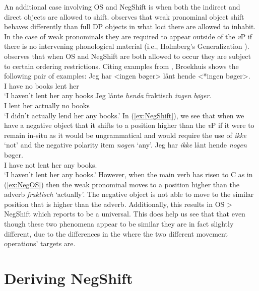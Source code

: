 \documentclass[12pt, letterpaper]{article}
\begin{document}
An additional case involving OS and NegShift is when both the indirect and direct objects are allowed to shift. \citet[417f]{broekhuisUnificationObjectShift2020} observes that weak pronominal object shift behaves differently than full DP objects in what loci there are allowed to inhabit. In the case of weak pronominals they are required to appear outside of the \textit{v}P if there is no intervening phonological material (i.e., Holmberg's Generalization \cite{holmbergWordOrderSyntactic1986,holmbergRemarksHolmbergGeneralization1999}). \citeauthor{broekhuisUnificationObjectShift2020} observes that when OS and NegShift are both allowed to occur they are subject to certain ordering restrictions. Citing examples from \citet[163ff]{christensenInterfacesNegationSyntax2005}, Broekhuis shows the following pair of examples:
	\ea 
		\ea \label{ex:NegShift}
		\gll Jeg har <ingen bøger> lånt hende <*ingen bøger>.\\
		I have no books lent her\\
		\glt `I haven't lent her any books
		\ex \label{ex:NegOS}
		\gll Jeg lånte \textit{henda} fraktisch \textit{ingen} \textit{bøger}.\\
		I lent her actually no books\\
		\glt `I didn't actually lend her any books.'
		\z 
	\z
In (\ref{ex:NegShift}), we see that when we have a negative object that it shifts to a position higher than the \textit{v}P if it were to remain in-situ as it would be ungrammatical and would require the use of \textit{ikke} `not' and the negative polarity item \textit{nogen} `any'.
	\ea
	\gll Jeg har \textit{ikke} lånt hende \textit{nogen} bøger.\\
	I have not lent her any books.\\
	\glt `I haven't lent her any books.'
	\z
However, when the main verb has risen to C as in (\ref{ex:NegOS}) then the weak pronominal moves to a position higher than the adverb \textit{fraktisch} `actually'. The negative object is not able to move to the similar position that is higher than the adverb. Additionally, this results in OS > NegShift which \citeauthor{broekhuisUnificationObjectShift2020} reports to be a universal. This does help us see that that even though these two phenomena appear to be similar they are in fact slightly different, due to the differences in the where the two different movement operations' targets are.

\section{Deriving NegShift} \label{sec:ZEIJLSTRA}
\end{document}
